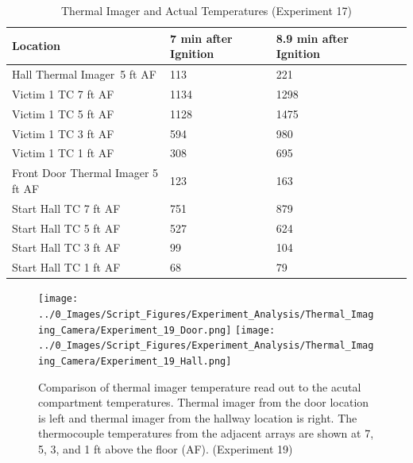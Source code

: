 \documentclass[12pt,oneside]{book}
\begin{document}
\begin{table}[H]
\centering
\begin{tabular}{|L{0.25\textwidth}|C{0.15\textwidth}|C{0.15\textwidth}|C{0.15\textwidth}|C{0.15\textwidth}|}
\hline
Location	                    &7 min after Ignition	&8.9 min after Ignition \\ \hline \hline
Hall Thermal Imager~5 ft AF 	&113	&221	\\ \hline
Victim 1 TC 7 ft AF				&1134	&1298	\\ \hline
Victim 1 TC 5 ft AF				&1128	&1475	\\ \hline
Victim 1 TC 3 ft AF				&594	&980	\\ \hline
Victim 1 TC 1 ft AF				&308	&695	\\ \hline
Front Door Thermal Imager 5 ft AF &123	&163	\\ \hline
Start Hall TC 7 ft AF			&751	&879	\\ \hline
Start Hall TC 5 ft AF			&527	&624	\\ \hline
Start Hall TC 3 ft AF			&99		&104	\\ \hline
Start Hall TC 1 ft AF			&68		&79		\\ \hline
\end{tabular}
\caption{Thermal Imager and Actual Temperatures (Experiment 17)}
\label{table:hall_thermal_imager_17}
\end{table}

\begin{figure}[H]
\centering
\texttt{[image: ../0\_Images/Script\_Figures/Experiment\_Analysis/Thermal\_Imaging\_Camera/Experiment\_19\_Door.png]}
\texttt{[image: ../0\_Images/Script\_Figures/Experiment\_Analysis/Thermal\_Imaging\_Camera/Experiment\_19\_Hall.png]}
\caption[Thermal Imager H]{Comparison of thermal imager temperature read out to the acutal compartment temperatures. Thermal imager from the door location is left and thermal imager from the hallway location is right. The thermocouple temperatures from the adjacent arrays are shown at 7, 5, 3, and 1 ft above the floor (AF). (Experiment 19)}
\label{fig:thermal_imager_j}
\end{figure}
\end{document}
